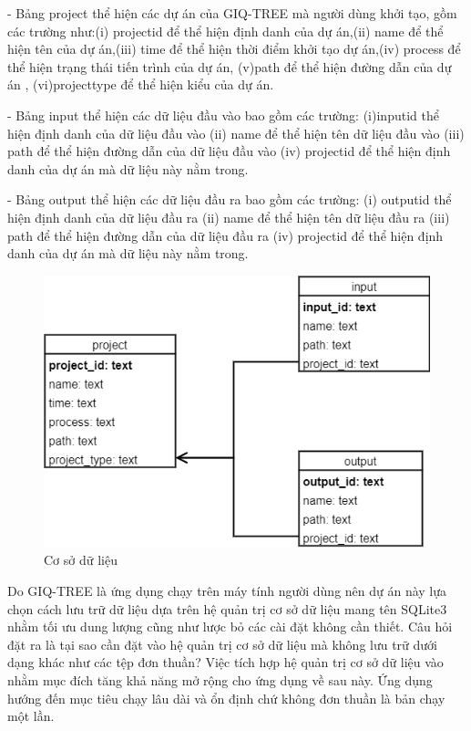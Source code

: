 \documentclass[12pt]{report}
\begin{document}
- Bảng project thể hiện các dự án của GIQ-TREE mà người dùng khởi tạo, gồm các trường như:(i) project\textunderscore id  để thể hiện định danh của dự án,(ii) name để thể hiện tên của dự án,(iii) time để thể hiện thời điểm khởi tạo dự án,(iv) process để thể hiện trạng thái tiến trình của dự án, (v)path để thể hiện đường dẫn của dự án , (vi)project\textunderscore type để thể hiện kiểu của dự án.

- Bảng input thể hiện các dữ liệu đầu vào bao gồm các trường: (i)input\textunderscore id thể hiện định danh của dữ liệu đầu vào (ii) name để thể hiện tên dữ liệu đầu vào (iii) path để thể hiện đường dẫn của dữ liệu đầu vào (iv) project\textunderscore id để thể hiện định danh của dự án mà dữ liệu này nằm trong.

- Bảng output thể hiện các dữ liệu đầu ra bao gồm các trường: (i) output\textunderscore id thể hiện định danh của dữ liệu đầu ra (ii) name để thể hiện tên dữ liệu đầu ra (iii) path để thể hiện đường dẫn của dữ liệu đầu ra (iv) project\textunderscore id để thể hiện định danh của dự án mà dữ liệu này nằm trong.

\begin{figure}[h]
	\centering
	\includegraphics[scale=0.8]{Image/4.3.png}
	\caption{Cơ sở dữ liệu }
	\label{fig:image4.3}
\end{figure}

Do GIQ-TREE là ứng dụng chạy trên máy tính người dùng nên dự án này lựa chọn cách lưu trữ dữ liệu dựa trên hệ quản trị cơ sở dữ liệu mang tên SQLite3 nhằm tối ưu dung lượng cũng như lược bỏ các cài đặt không cần thiết. Câu hỏi đặt ra là tại sao cần đặt vào hệ quản trị cơ sở dữ liệu mà không lưu trữ dưới dạng khác như các tệp đơn thuần? Việc tích hợp hệ quản trị cơ sở dữ liệu vào nhằm mục đích tăng khả năng mở rộng cho ứng dụng về sau này. Ứng dụng hướng đến mục tiêu chạy lâu dài và ổn định chứ không đơn thuần là bản chạy một lần.
\end{document}
